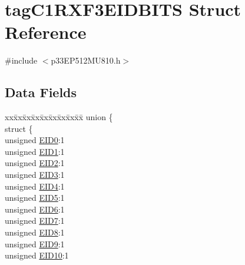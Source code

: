 \hypertarget{structtag_c1_r_x_f3_e_i_d_b_i_t_s}{}\section{tag\+C1\+R\+X\+F3\+E\+I\+D\+B\+I\+TS Struct Reference}
\label{structtag_c1_r_x_f3_e_i_d_b_i_t_s}


{\ttfamily \#include $<$p33\+E\+P512\+M\+U810.\+h$>$}

\subsection*{Data Fields}
\begin{DoxyCompactItemize}
\item 
\begin{tabbing}
xx\=xx\=xx\=xx\=xx\=xx\=xx\=xx\=xx\=\kill
union \{\\
\>struct \{\\
\>\>unsigned \hyperlink{structtag_c1_r_x_f3_e_i_d_b_i_t_s_a9da8b7b30247e4f9cd8cc056549aa9fd}{EID0}:1\\
\>\>unsigned \hyperlink{structtag_c1_r_x_f3_e_i_d_b_i_t_s_afd6c139491d147c1262f3d051c6691e9}{EID1}:1\\
\>\>unsigned \hyperlink{structtag_c1_r_x_f3_e_i_d_b_i_t_s_a36ec62d8d3c5acd5d15e6691dc099a94}{EID2}:1\\
\>\>unsigned \hyperlink{structtag_c1_r_x_f3_e_i_d_b_i_t_s_ab895f7d0ac289a0383b607cbc62eebe2}{EID3}:1\\
\>\>unsigned \hyperlink{structtag_c1_r_x_f3_e_i_d_b_i_t_s_a136d5a709d6618d40acceccb43036656}{EID4}:1\\
\>\>unsigned \hyperlink{structtag_c1_r_x_f3_e_i_d_b_i_t_s_a8dffb2d86a6c184df505ae7c71a58710}{EID5}:1\\
\>\>unsigned \hyperlink{structtag_c1_r_x_f3_e_i_d_b_i_t_s_af8a8574102515d8f1a4b7fd1685d0532}{EID6}:1\\
\>\>unsigned \hyperlink{structtag_c1_r_x_f3_e_i_d_b_i_t_s_a84c3262e67f8d5fd387ac10bde6fa9b1}{EID7}:1\\
\>\>unsigned \hyperlink{structtag_c1_r_x_f3_e_i_d_b_i_t_s_acca25e0b7d86eb499d01f85222baea87}{EID8}:1\\
\>\>unsigned \hyperlink{structtag_c1_r_x_f3_e_i_d_b_i_t_s_ac6748f73d4ada8538b06548be4f396c2}{EID9}:1\\
\>\>unsigned \hyperlink{structtag_c1_r_x_f3_e_i_d_b_i_t_s_a9cea8e77ecbb72bd3b08102412793725}{EID10}:1\\

\end{tabbing}
\end{DoxyCompactItemize}
